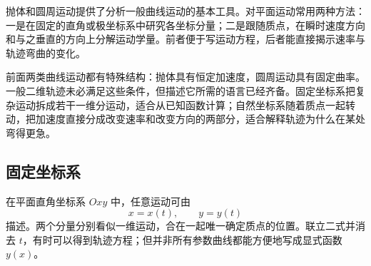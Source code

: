 {\newcommand{\KQuestionCR}{%
\begin{center}\begin{minipage}{.97\linewidth}\centering
\begin{tikzpicture}[>=Latex,scale=1.15]
\draw[kcurve] \FoldedCurvePath;\FoldedCurvePoints
\end{tikzpicture}
\figcap{题图：比较 $P_1,P_2,P_3,P_4$ 的局部弯曲，注意 $P_3$ 后向左下回折。}\label{ch03:ref:question-figure-2-69}
\end{minipage}\end{center}
}

\newcommand{\KQuestionCS}{%
\begin{center}\begin{minipage}{.97\linewidth}\centering
\begin{tikzpicture}[>=Latex,scale=.9]

\draw[thick] (0,0) ellipse(3 and 1.6);\draw (0,0)--(3,0) node[midway,below]{$a$};
\draw (0,0)--(0,1.6) node[midway,left]{$b$};\node[below left] at (0,0){$O$};

\end{tikzpicture}
\figcap{题图：椭圆的半长轴为 $a$、半短轴为 $b$。}\label{ch03:ref:question-figure-2-70}
\end{minipage}\end{center}
}


抛体和圆周运动提供了分析一般曲线运动的基本工具。对平面运动常用两种方法：一是在固定的直角或极坐标系中研究各坐标分量；二是跟随质点，在瞬时速度方向和与之垂直的方向上分解运动学量。前者便于写运动方程，后者能直接揭示速率与轨迹弯曲的变化。

前面两类曲线运动都有特殊结构：抛体具有恒定加速度，圆周运动具有固定曲率。一般二维轨迹未必满足这些条件，但描述它所需的语言已经齐备。固定坐标系把复杂运动拆成若干一维分运动，适合从已知函数计算；自然坐标系随着质点一起转动，把加速度直接分成改变速率和改变方向的两部分，适合解释轨迹为什么在某处弯得更急。

\subsection{固定坐标系}

\FixedCoordinatesDiagram

在平面直角坐标系 $Oxy$ 中，任意运动可由
\begin{equation}
 x=x(t),\qquad y=y(t)
\end{equation}
描述。两个分量分别看似一维运动，合在一起唯一确定质点的位置。联立二式并消去 $t$，有时可以得到轨迹方程；但并非所有参数曲线都能方便地写成显式函数 $y(x)$。

}
